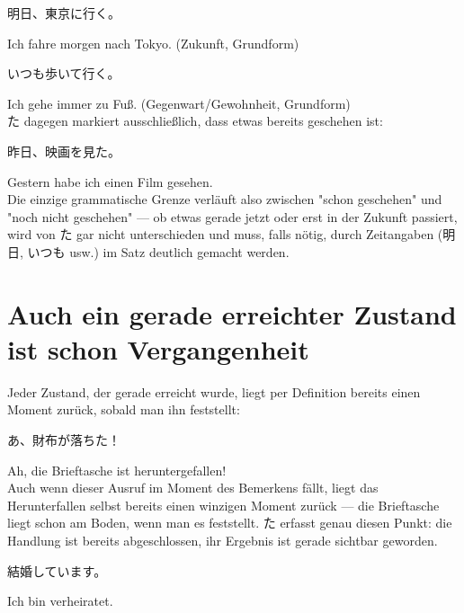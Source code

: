 \documentclass[12pt]{book}
\begin{document}
\par\quad 明日、東京に行く。\\
\par\quad Ich fahre morgen nach Tokyo. (Zukunft, Grundform)\\

\par\quad いつも歩いて行く。\\
\par\quad Ich gehe immer zu Fuß. (Gegenwart/Gewohnheit, Grundform)\\

た dagegen markiert ausschließlich, dass etwas bereits geschehen ist:

\par\quad 昨日、映画を見た。\\
\par\quad Gestern habe ich einen Film gesehen.\\

Die einzige grammatische Grenze verläuft also zwischen "schon geschehen" und "noch nicht geschehen" — ob etwas gerade jetzt oder erst in der Zukunft passiert, wird von た gar nicht unterschieden und muss, falls nötig, durch Zeitangaben (明日, いつも usw.) im Satz deutlich gemacht werden.

\section*{Auch ein gerade erreichter Zustand ist schon Vergangenheit}

Jeder Zustand, der gerade erreicht wurde, liegt per Definition bereits einen Moment zurück, sobald man ihn feststellt:

\par\quad あ、財布が落ちた！\\
\par\quad Ah, die Brieftasche ist heruntergefallen!\\

Auch wenn dieser Ausruf im Moment des Bemerkens fällt, liegt das Herunterfallen selbst bereits einen winzigen Moment zurück — die Brieftasche liegt schon am Boden, wenn man es feststellt. た erfasst genau diesen Punkt: die Handlung ist bereits abgeschlossen, ihr Ergebnis ist gerade sichtbar geworden.

\par\quad 結婚しています。\\
\par\quad Ich bin verheiratet.\\
\end{document}
